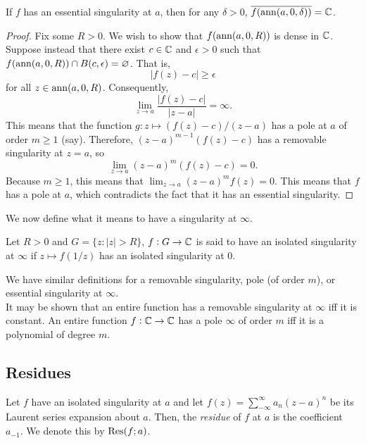 	\begin{ftheo}
		If $f$ has an essential singularity at $a$, then for any $\delta > 0$, $\overline{f(\operatorname{ann}(a,0,\delta))} = \mathbb{C}$.
	\end{ftheo}
	\begin{proof}
		Fix some $R > 0$. We wish to show that $f(\operatorname{ann}(a,0,R))$ is dense in $\mathbb{C}$. Suppose instead that there exist $c \in \mathbb{C}$ and $\epsilon > 0$ such that $f(\operatorname{ann}(a,0,R)) \cap B(c,\epsilon) = \varnothing$. That is,
		\[ |f(z) - c| \ge \epsilon \]
		for all $z \in \operatorname{ann}(a,0,R)$. Consequently,
		\[ \lim_{z \to a} \frac{|f(z) - c|}{|z-a|} = \infty. \]
		This means that the function $g : z \mapsto (f(z) - c)/(z-a)$ has a pole at $a$ of order $m \ge 1$ (say). Therefore, $(z-a)^{m-1} (f(z) - c)$ has a removable singularity at $z = a$, so
		\[ \lim_{z \to a} (z-a)^{m} (f(z) - c) = 0. \]
		Because $m \ge 1$, this means that $\lim_{z \to a} (z-a)^m f(z) = 0$. This means that $f$ has a pole at $a$, which contradicts the fact that it has an essential singularity.
	\end{proof}

	We now define what it means to have a singularity at $\infty$.

	\begin{definition}
		Let $R > 0$ and $G = \{z : |z| > R\}$, $f : G \to \mathbb{C}$ is said to have an isolated singularity at $\infty$ if $z \mapsto f(1/z)$ has an isolated singularity at $0$.
	\end{definition}
	We have similar definitions for a removable singularity, pole (of order $m$), or essential singularity at $\infty$.\\
	It may be shown that an entire function has a removable singularity at $\infty$ iff it is constant. An entire function $f : \mathbb{C} \to \mathbb{C}$ has a pole $\infty$ of order $m$ iff it is a polynomial of degree $m$.\\

\subsection{Residues}

	\begin{fdef}
		Let $f$ have an isolated singularity at $a$ and let $f(z) = \sum_{-\infty}^{\infty} a_n (z-a)^n$ be its Laurent series expansion about $a$. Then, the \emph{residue} of $f$ at $a$ is the coefficient $a_{-1}$. We denote this by $\operatorname{Res}(f;a)$.
	\end{fdef}

